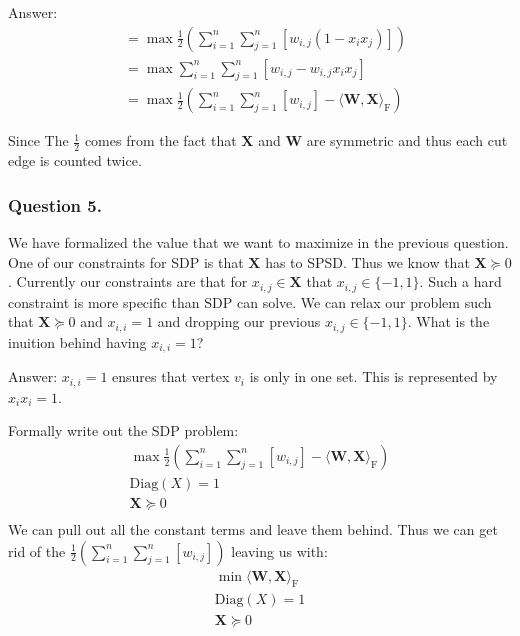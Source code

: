 \documentclass{article}
\begin{document}
Answer:
\begin{align*}
 &= \max \frac{1}{2} \left (\sum_{i = 1}^n \sum_{j = 1}^n[ w_{i, j}(1 - x_i x_j) ] \right)\\
 &= \max  \sum_{i = 1}^n \sum_{j = 1}^n[ w_{i, j} - w_{i, j} x_i x_j ]\\
 &= \max \frac{1}{2} \left ( \sum_{i = 1}^n \sum_{j = 1}^n[w_{i, j}] - \langle \mathbf{W}, \mathbf{X} \rangle_{\mathrm{F}} \right )
\end{align*}

Since 
The \( \frac{1}{2} \) comes from the fact that \( \mathbf{X} \) and \( \mathbf{W} \) are symmetric and thus each cut edge is counted twice.

\subsubsection{Question 5.}
We have formalized the value that we want to maximize in the previous question.
One of our constraints for SDP is that \( \mathbf{X} \) has to SPSD.
Thus we know that \( \mathbf{X} \succeq 0 \).
Currently our constraints are that for \( x_{i, j} \in \mathbf{X} \) that \( x_{i, j} \in \{ -1, 1 \} \).
Such a hard constraint is more specific than SDP can solve.
We can relax our problem such that \( \mathbf{X} \succeq 0\) and \( x_{i, i} = 1 \) and dropping our previous \( x_{i, j} \in \{ -1, 1 \} \).
What is the inuition behind having \( x_{i, i} = 1 \)?

Answer: \( x_{i, i} = 1 \) ensures that vertex \( v_i \) is only in one set. This is represented by \( x_i x_i = 1 \).

Formally write out the SDP problem:
\begin{gather*}
\max \frac{1}{2} \left ( \sum_{i = 1}^n \sum_{j = 1}^n[w_{i, j}] - \langle \mathbf{W}, \mathbf{X} \rangle_{\mathrm{F}} \right ) \\
\text{Diag}(X) = 1 \\
\mathbf{X} \succeq 0 \\
\end{gather*}
We can pull out all the constant terms and leave them behind. Thus we can get rid of the \( \frac{1}{2} \left( \sum_{i = 1}^n \sum_{j = 1}^n [w_{i, j}] \right) \) leaving us with:
\begin{gather*}
\min \langle \mathbf{W}, \mathbf{X} \rangle_{\mathrm{F}} \\
\text{Diag}(X) = 1 \\
\mathbf{X} \succeq 0 \\
\end{gather*}
\end{document}
